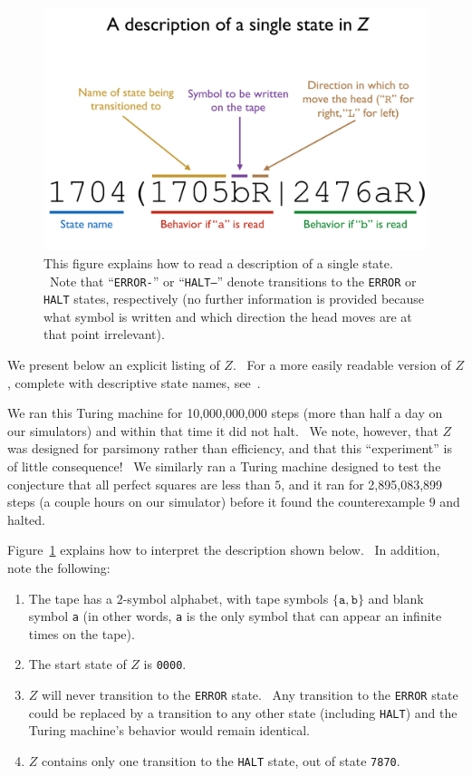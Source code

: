 \documentclass[11pt]{article}
\newcommand{\zhaltstate}{\texttt{7870}}
\begin{document}
\begin{appendices}
\begin{figure}[h]
\begin{center}
\includegraphics[scale=0.4]{figs/syntax.png}
\caption{This figure explains how to read a description of a single state. \ Note that ``\texttt{ERROR-}'' or ``\texttt{HALT--}'' denote transitions to the \texttt{ERROR} or \texttt{HALT} states, respectively (no further information is provided because what symbol is written and which direction the head moves are at that point irrelevant). \label{fig:syntax}}
\end{center}
\end{figure}

We present below an explicit listing of $Z$. \ For a more easily readable version of $Z$, complete with descriptive state names, see~\cite{github}.

We ran this Turing machine for 10,000,000,000 steps (more than half a day on our simulators) and within that time it did not halt. \ We note, however, that $Z$ was designed for parsimony rather than efficiency, and that this ``experiment'' is of little consequence! \ We similarly ran a Turing machine designed to test the conjecture that all perfect squares are less than $5$, and it ran for 2,895,083,899 steps (a couple hours on our simulator) before it found the counterexample $9$ and halted.

Figure~\ref{fig:syntax} explains how to interpret the description shown below. \ In addition, note the following:

\begin{enumerate}

\item The tape has a $2$-symbol alphabet, with tape symbols $\{\texttt{a}, \texttt{b}\}$ and blank symbol \texttt{a} (in other words, \texttt{a} is the only symbol that can appear an infinite times on the tape).
\item The start state of $Z$ is \texttt{0000}.
\item $Z$ will never transition to the \texttt{ERROR} state. \ Any transition to the \texttt{ERROR} state could be replaced by a transition to any other state (including \texttt{HALT}) and the Turing machine's behavior would remain identical.
\item $Z$ contains only one transition to the \texttt{HALT} state, out of state \zhaltstate.


\end{enumerate}
\end{appendices}
\end{document}
